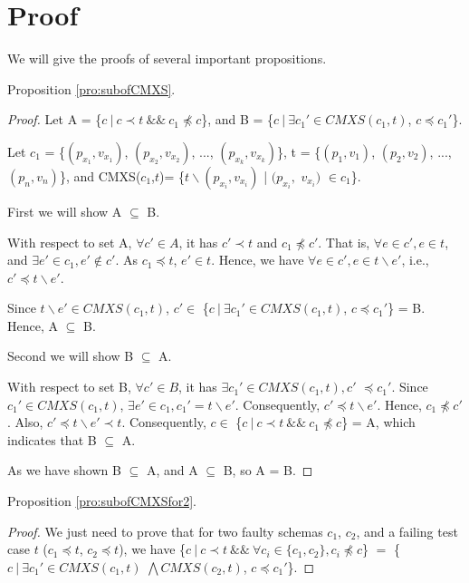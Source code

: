 {%
\appendix
\section{Proof}

We will give the proofs of several important propositions.

Proposition \ref{pro:subofCMXS}.
\begin{proof}

Let A =  \{$c\ |\ c \prec t\ \&\&\ c_{1} \npreceq c$\}, and B = \{$ c\ |\ \exists c_{1}' \in CMXS(c_{1}, t)$, $c \preceq c_{1}'$\}.



Let $c_{1}$ = \{$(p_{x_{1}}, v_{x_{1}})$, $(p_{x_{2}}, v_{x_{2}})$, ..., $(p_{x_{k}}, v_{x_{k}})$\},  t = \{$(p_{1}, v_{1})$, $(p_{2}, v_{2})$, ..., $(p_{n}, v_{n})$\}, and CMXS($c_{1}$,$t$)= \{$t \backslash (p_{x_{i}}, v_{x_{i}})$ | $(p_{x_{i}},$ $v_{x_{i}})$ $ \in c_{1} $\}.

First we will show A $\subseteq$ B.

With respect to set A, $\forall c' \in A$, it has $c' \prec t$ and $ c_{1} \npreceq c'$. That is, $\forall e \in c', e \in t$, and  $\exists e' \in c_{1}, e' \not\in c'$. As $c_{1} \preceq t$, $e' \in t$. Hence, we have $\forall e \in c', e \in t \backslash e'$, i.e., $c' \preceq t \backslash e'$.

Since $t \backslash e' \in CMXS(c_{1}, t)$,  $c' \in $ \{$ c\ |\ \exists c_{1}' \in CMXS(c_{1}, t)$, $c \preceq c_{1}'$\} = B. Hence, A $\subseteq$ B.

Second we will show B $\subseteq$ A.

With respect to set B, $\forall c' \in B$, it has $\exists c_{1}' \in CMXS(c_{1}, t), c'$ $ \preceq c_{1}'$. Since $c_{1}' \in CMXS(c_{1}, t)$, $\exists e' \in c_{1}, c_{1}' =  t \backslash e'$. Consequently, $c' \preceq t \backslash e'$. Hence, $c_{1} \npreceq c'$. Also, $c' \preceq t \backslash e' \prec t$. Consequently, $c \in $  \{$c\ |\ c \prec t\ \&\&\ c_{1} \npreceq c$\} = A, which indicates that B $\subseteq$ A.

As we have shown B $\subseteq$ A, and A $\subseteq$ B, so A = B.

\end{proof}

Proposition \ref{pro:subofCMXSfor2}.
\begin{proof}

We just need to prove that for two faulty schemas $c_{1}$, $c_{2}$, and a failing test case $t$ ($c_{1} \preceq t$, $c_{2} \preceq t$), we have \{$c\ |\ c \prec t\ \&\&\ \forall c_{i} \in \{c_{1}, c_{2}\}, c_{i} \npreceq c $\} $=$  \{$ c\ |\ \exists c_{1}' \in CMXS(c_{1}, t)$ $\bigwedge CMXS(c_{2}, t)$, $c \preceq c_{1}'$\}.


\end{proof}}
